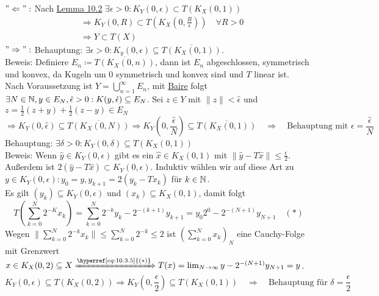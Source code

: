 \begin{beweis}
	$"\Leftarrow":$ Nach \hyperref[lemma:10.2]{Lemma 10.2} $\exists \epsilon > 0: K_{Y}(0, \epsilon) \subset T(K_{X}(0, 1)) $
	\begin{align*}
		& \Rightarrow K_{Y}(0, R) \subset T(K_{X}(0, \frac{R}{\epsilon})) \quad \forall R > 0 \\
		& \Rightarrow Y \subset T(X)
	\end{align*}
	$"\Rightarrow":$ Behauptung: $\exists \epsilon > 0: K_{y}(0, \epsilon) \subseteq \overline{T(K_{X}(0,1))}$. \\
	Beweis: Definiere $E_{n} \coloneqq \overline{T(K_{X}(0, n))}$, dann ist $E_{n}$ abgeschlossen, symmetrisch und konvex, da Kugeln um $0$ symmetrisch und konvex sind und $T$ linear ist. \\
	Nach Voraussetzung ist $Y = \bigcup_{n = 1}^{\infty} E_{n}$, mit \hyperref[satz:9.1-baire]{Baire} folgt $\exists N \in \mathbb{N}, y \in E_{N}, \hat \epsilon > 0: K(y, \hat \epsilon) \subseteq E_{N}$. Sei $z \in Y$ mit $\| z \| < \hat \epsilon$ und $z = \frac{1}{2} (z + y) + \frac{1}{2} (z - y) \in E_{N}$
		\[ \Rightarrow K_{Y}(0, \hat \epsilon) \subseteq \overline{T(K_{X}(0, N))} \Rightarrow K_{Y}(0, \frac{\hat \epsilon}{N}) \subseteq \overline{T(K_{X}(0, 1))} \quad \Rightarrow \quad \text{Behauptung mit } \epsilon = \frac{\hat \epsilon}{N}  \]
		Behauptung: $\exists \delta > 0: K_{Y}(0, \delta) \subseteq T(K_{X}(0, 1))$ \\
		Beweis: Wenn $\hat y \in K_{Y}(0, \epsilon)$ gibt es ein $\hat x \in K_{X}(0, 1)$ mit $\| \hat y - T \hat x \| \leq \frac{\epsilon}{2}$. \\
		Au{\ss}erdem ist $2 (\hat y - T \hat x) \subset K_{Y}(0, \epsilon)$. Induktiv wählen wir auf diese Art zu $y \in K_{Y}(0, \epsilon): y_{0} = y, y_{k + 1} = 2 ( y_{k} - T x_{k})$ für $k \in \mathbb{N}$. \\
		Es gilt $(y_{k}) \subseteq K_{Y}(0, \epsilon)$ und $(x_{k}) \subseteq K_{X}(0, 1)$, damit folgt
		\[ T \left( \sum_{k = 0}^{N} 2^{-K} x_{k} \right) = \sum_{k = 0}^{N} 2^{-k} y_{k} - 2^{-(k+1)} y_{k+1} = y_{0} 2^{0} - 2^{-(N+1)} y_{N+1} \quad (*) \label{eq:10.3.5} \]
		Wegen $\| \sum_{k = 0}^{N} 2^{-k} x_{k} \| \leq \sum_{k = 0}^{N} 2^{-k} \leq 2$ ist $\left( \sum_{k = 0}^{N} x_{k} \right)_{N}$ eine Cauchy-Folge mit Grenzwert $x \in K_{X}(0, 2) \subseteq X \xRightarrow[]{\hyperref[eq:10.3.5]{(*)}} T(x) = \lim_{N \rightarrow \infty} y - 2^{-(N+1)} y_{N+1} = y$. 
		\[ K_{Y} \left( 0, \epsilon \right) \subseteq T \left( K_{X}(0, 2) \right) \Rightarrow K_{Y} \left( 0, \frac{\epsilon}{2} \right) \subseteq T \left( K_{X}(0, 1) \right) \quad \Rightarrow \quad \text{Behauptung für } \delta = \frac{\epsilon}{2} \]
\end{beweis}



